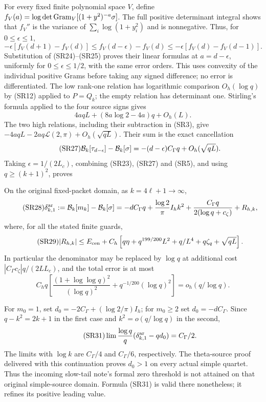 For every fixed finite polynomial space $V$, define
$f_V(a)=\log\det\operatorname{Gram}_V[(1+y^2)^{-a}\sigma]$.
The full positive determinant integral shows that $f_V''$ is the variance of
$\sum_i\log(1+y_i^2)$ and is nonnegative. Thus, for $0\le\epsilon\le1$,
\begin{equation}\tag{SR26}
 -\epsilon[f_V(d+1)-f_V(d)]
 \le f_V(d-\epsilon)-f_V(d)
 \le-\epsilon[f_V(d)-f_V(d-1)].
\end{equation}
Substitution of (SR24)--(SR25) proves their linear formulas at
$a=d-\epsilon$, uniformly for $0\le\epsilon\le1/2$, with the same error
orders. This uses convexity of the individual positive Grams before taking
any signed difference; no error is differentiated.
The low rank-one relation has logarithmic comparison $O_h(\log q)$ by
(SR12) applied to $P=Q_k$; the empty relation has determinant one.
Stirling's formula \cite{a02sr:DLMFGamma} applied to the four source signs gives
\[
 4aqL+(8a\log2-4a)q+O_h(L).
\]
The two high relations, including their subtraction in (SR3), give
$-4aqL-2aq\mathcal L(2,\pi)+O_h(\sqrt{qL})$.
Their sum is the exact cancellation
\begin{equation}\tag{SR27}
 \mathcal B_k[\tau_{d-\epsilon}]-\mathcal B_k[\sigma]
 =-(d-\epsilon)C_\Gamma q+O_h(\sqrt{qL}).
\end{equation}
Taking $\epsilon=1/(2L_c)$, combining (SR23), (SR27) and (SR5), and using
$q\ge(k+1)^2$, proves
\begin{theorem}
On the original fixed-packet domain, as $k=4\ell+1\to\infty$,
\begin{equation}\tag{SR28}
 \delta_{k,1}^{\rm ar}:=\mathcal B_k[m_k]-\mathcal B_k[\sigma]
 =-dC_\Gamma q+\frac{\log2}{\pi}I_hk^2
 +\frac{C_\Gamma q}{2(\log q+c_\zeta)}+R_{h,k},
\end{equation}
where, for all the stated finite guards,
\begin{equation}\tag{SR29}
 |R_{h,k}|\le E_{\rm cen}
 +C_h\left[q\eta+q^{199/200}L^2+q/L^4+q\zeta_q+\sqrt{qL}\right].
\end{equation}
In particular the denominator may be replaced by $\log q$ at additional
cost $|C_\Gamma c_\zeta|q/(2LL_c)$, and the total error is at most
\begin{equation}\tag{SR30}
 C_hq\left[\frac{(1+\log\log q)^2}{(\log q)^2}
                  +q^{-1/200}(\log q)^2\right]
 =o_h(q/\log q).
\end{equation}
\end{theorem}
For $m_0=1$, set $d_0=-2C_\Gamma+(\log2/\pi)I_h$; for $m_0\ge2$ set
$d_0=-dC_\Gamma$. Since $q-k^2=2k+1$ in the first case and
$k^2=o(q/\log q)$ in the second,
\begin{equation}\tag{SR31}
 \lim\frac{\log q}{q}(\delta_{k,1}^{\rm ar}-qd_0)=C_\Gamma/2.
\end{equation}
The limits with $\log k$ are $C_\Gamma/4$ and $C_\Gamma/6$, respectively.
The theta-source proof delivered with this continuation proves $d_0>1$ on
every actual simple quartet. Thus the incoming slow-tail note's formal zero
threshold is not attained on that original simple-source domain. Formula
(SR31) is valid there nonetheless; it refines its positive leading value.

